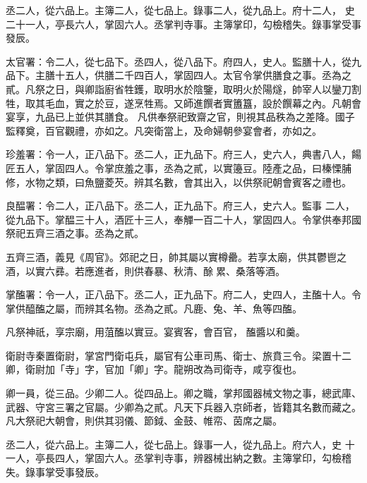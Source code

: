 \begin{pinyinscope}
 丞二人，從六品上。主簿二人，從七品上。錄事二人，從九品上。府十二人，
 史二十一人，亭長六人，掌固六人。丞掌判寺事。主簿掌印，勾檢稽失。錄事掌受事發辰。



 太官署：令二人，從七品下。丞四人，從八品下。府四人，史人。監膳十人，從九品下。主膳十五人，供膳二千四百人，掌固四人。太官令掌供膳食之事。丞為之貳。凡祭之日，與卿詣廚省牲鑊，取明水於陰鑒，取明火於陽燧，帥宰人以鑾刀割牲，取其毛血，實之於豆，遂烹牲焉。又師進饌者實簠簋，設於饌幕之內。凡朝會宴享，九品已上並供其膳食。
 凡供奉祭祀致齋之官，則視其品秩為之差降。國子監釋奠，百官觀禮，亦如之。凡突衛當上，及命婦朝參宴會者，亦如之。



 珍羞署：令一人，正八品下。丞二人，正九品下。府三人，史六人，典書八人，餳匠五人，掌固四人。令掌庶羞之事，丞為之貳，以實籩豆。陸產之品，曰榛慄脯修，水物之類，曰魚鹽菱芡。辨其名數，會其出入，以供祭祀朝會賓客之禮也。



 良醖署：令二人，正八品下。丞二人，正九品下。府三人，史六人。監事
 二人，從九品下。掌醖三十人，酒匠十三人，奉觶一百二十人，掌固四人。令掌供奉邦國祭祀五齊三酒之事。丞為之貳。



 五齊三酒，義見《周官》。郊祀之日，帥其屬以實樽罍。若享太廟，供其鬱鬯之酒，以實六彞。若應進者，則供春暴、秋清、酴累、桑落等酒。



 掌醢署：令一人，正八品下。丞二人，正九品下。府二人，史四人，主醢十人。令掌供醯醢之屬，而辨其名物。丞為之貳。凡鹿、兔、羊、魚等四醢。



 凡祭神祇，享宗廟，用菹醢以實豆。宴賓客，會百官，
 醢醬以和羹。



 衛尉寺秦置衛尉，掌宮門衛屯兵，屬官有公車司馬、衛士、旅賁三令。梁置十二卿，衛尉加「寺」字，官加「卿」字。龍朔改為司衛寺，咸亨復也。



 卿一員，從三品。少卿二人。從四品上。卿之職，掌邦國器械文物之事，總武庫、武器、守宮三署之官屬。少卿為之貳。凡天下兵器入京師者，皆籍其名數而藏之。凡大祭祀大朝會，則供其羽儀、節鉞、金鼓、帷帟、茵席之屬。



 丞二人，從六品上。主簿二人，從七品上。錄事一人，從九品上。府六人，史
 十一人，亭長四人，掌固六人。丞掌判寺事，辨器械出納之數。主簿掌印，勾檢稽失。錄事掌受事發辰。




\end{pinyinscope}
